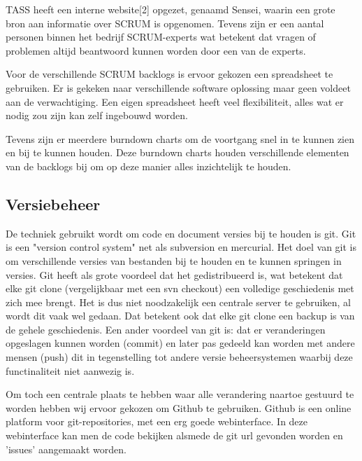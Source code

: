 \documentclass[]{article}
\begin{document}
TASS heeft een interne website[2] opgezet, genaamd Sensei, waarin
een grote bron aan informatie over SCRUM is opgenomen. Tevens zijn er een
aantal personen binnen het bedrijf SCRUM-experts wat betekent dat vragen of
problemen altijd beantwoord kunnen worden door een van de experts.

Voor de verschillende SCRUM backlogs is ervoor gekozen een spreadsheet te
gebruiken. Er is gekeken naar verschillende software oplossing maar geen
voldeet aan de verwachtiging. Een eigen spreadsheet heeft veel
flexibiliteit, alles wat er nodig zou zijn kan zelf ingebouwd worden.

Tevens zijn er meerdere burndown charts om de voortgang snel in te kunnen
zien en bij te kunnen houden. Deze burndown charts houden verschillende
elementen van de backlogs bij om op deze manier alles inzichtelijk te
houden.

\newpage
\subsection{Versiebeheer}
%
De techniek gebruikt wordt om code en document versies bij te houden is
git. Git is een "version control system" net als subversion en
mercurial. Het doel van git is om verschillende versies van bestanden bij
te houden en te kunnen springen in versies. Git heeft als grote voordeel
dat het gedistribueerd is, wat betekent dat elke git clone (vergelijkbaar
met een svn checkout) een volledige geschiedenis met zich mee brengt. Het is
dus niet noodzakelijk een centrale server te gebruiken, al wordt dit vaak
wel gedaan. Dat betekent ook dat elke git clone een backup is van de gehele
geschiedenis. Een ander voordeel van git is: dat er veranderingen opgeslagen
kunnen worden (commit) en later pas gedeeld kan worden met andere mensen (push) dit in
tegenstelling tot andere versie beheersystemen waarbij deze functinaliteit niet
aanwezig is.

Om toch een centrale plaats te hebben waar alle verandering naartoe
gestuurd te worden hebben wij ervoor gekozen om Github te gebruiken. Github
is een online platform voor git-repositories, met een erg goede
webinterface. In deze webinterface kan men de code bekijken alsmede de git url
gevonden worden en 'issues' aangemaakt worden.
\end{document}
